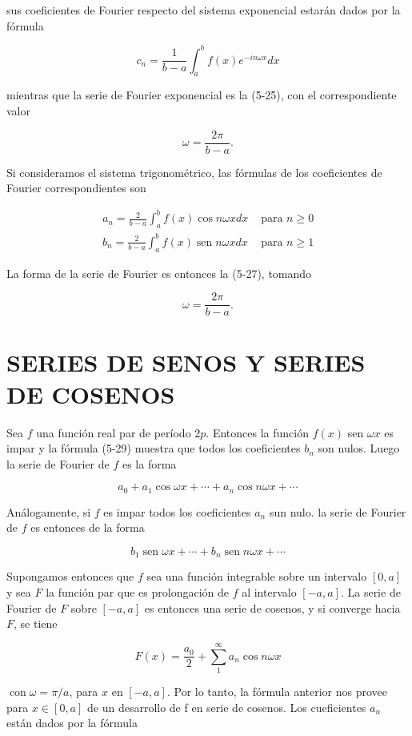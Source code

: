 \documentclass[10pt]{article}
\theoremstyle{plain}
\theoremstyle{definition}
\theoremstyle{remark}
\begin{document}
sus coeficientes de Fourier respecto del sistema exponencial estarán dados por la fórmula

$$
c_{n}=\frac{1}{b-a} \int_{a}^{b} f(x) e^{-i n \omega x} d x
$$

mientras que la serie de Fourier exponencial es la (5-25), con el correspondiente valor

$$
\omega=\frac{2 \pi}{b-a} .
$$

Si consideramos el sistema trigonométrico, las fórmulas de los coeficientes de Fourier correspondientes son

$$
\begin{array}{ll}
a_{n}=\frac{2}{b-a} \int_{a}^{b} f(x) \cos n \omega x d x & \text { para } n \geqslant 0 \\
b_{n}=\frac{2}{b-a} \int_{a}^{b} f(x) \operatorname{sen} n \omega x d x & \text { para } n \geqslant 1
\end{array}
$$

La forma de la serie de Fourier es entonces la (5-27), tomando

$$
\omega=\frac{2 \pi}{b-a} .
$$

\section*{SERIES DE SENOS Y SERIES DE COSENOS}
Sea $f$ una función real par de período $2 p$. Entonces la función $f(x)$ sen $\omega x$ es impar y la fórmula (5-29) muestra que todos los coeficientes $b_{n}$ son nulos. Luego la serie de Fourier de $f$ es la forma

$$
a_{0}+a_{1} \cos \omega x+\cdots+a_{n} \cos n \omega x+\cdots
$$

Análogamente, si $f$ es impar todos los coeficientes $a_{n}$ sun nulo. la serie de Fourier de $f$ es entonces de la forma

$$
b_{1} \operatorname{sen} \omega x+\cdots+b_{n} \operatorname{sen} n \omega x+\cdots
$$

Supongamos entonces que $f$ sea una función integrable sobre un intervalo $[0, a]$ y sea $F$ la función par que es prolongación de $f$ al intervalo $[-a, a]$. La serie de Fourier de $F$ sobre $[-a, a]$ es entonces una serie de cosenos, y si converge hacia $F$, se tiene

$$
F(x)=\frac{a_{0}}{2}+\sum_{1}^{\infty} a_{n} \cos n \omega x
$$

$\operatorname{con} \omega=\pi / a$, para $x$ en $[-a, a]$. Por lo tanto, la fórmula anterior nos provee para $x \in[0, a]$ de un desarrollo de f en serie de cosenos. Los cueficientes $a_{n}$ están dados por la fórmula
\end{document}
